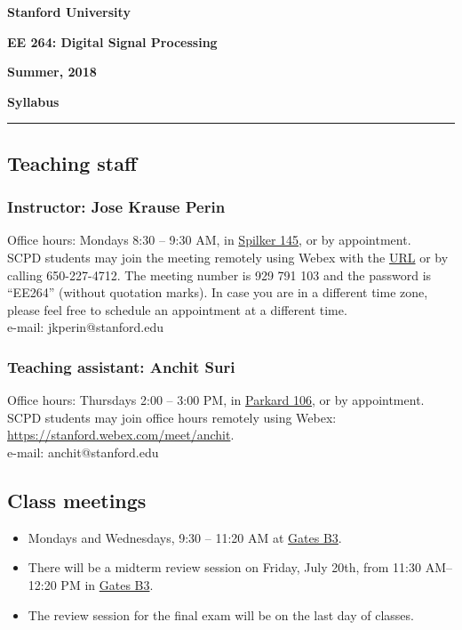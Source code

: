\documentclass[10pt]{article}
\begin{document}
\doublespacing
\begin{center}
	\textbf{\large Stanford University}
	
	\textbf{\large EE 264: Digital Signal Processing}
	
	\textbf{\large Summer, 2018}
	
	\vspace{2mm}
	
	\textbf{\large Syllabus}
\end{center}
\vspace{-5mm}
\rule{\textwidth}{0.5pt}
\singlespacing

\subsection*{Teaching staff} 

\subsubsection*{Instructor: Jose Krause Perin} 
Office hours: Mondays 8:30 -- 9:30 AM, in \href{https://campus-map.stanford.edu/?id=04-040&lat=37.42879024&lng=-122.1740029&zoom=17&srch=Spilker}{Spilker 145}, or by appointment. \\
SCPD students may join the meeting remotely using Webex with the \href{https://stanford.webex.com/stanford-en/j.php?MTID=m07046ca0da0ed2a46b9a203fa6707fb4}{URL} or by calling 650-227-4712. The meeting number is 929 791 103 and the password is ``EE264'' (without quotation marks). In case you are in a different time zone, please feel free to schedule an appointment at a different time. \\
e-mail: jkperin@stanford.edu

\subsubsection*{Teaching assistant: Anchit Suri} 
Office hours: Thursdays 2:00 -- 3:00 PM, in  \href{https://campus-map.stanford.edu/?id=04-030&lat=37.42924401&lng=-122.17383732&zoom=17&srch=packard}{Parkard 106}, or by appointment. \\
SCPD students may join office hours remotely using Webex: \href{https://stanford.webex.com/meet/anchit}{https://stanford.webex.com/meet/anchit}. \\
e-mail: anchit@stanford.edu

\subsection*{Class meetings} 
\begin{itemize}
	\item Mondays and Wednesdays, 9:30 -- 11:20 AM at \href{https://campus-map.stanford.edu/?srch=Gates+Computer+Science}{Gates B3}.
	\item There will be a midterm review session on Friday, July 20th, from 11:30 AM-- 12:20 PM in \href{https://campus-map.stanford.edu/?srch=Gates+Computer+Science}{Gates B3}.
	\item The review session for the final exam will be on the last day of classes.
\end{itemize}
\end{document}
